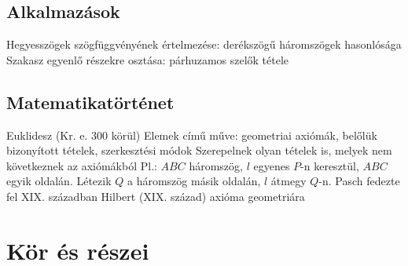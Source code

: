 \documentclass[twoside,12pt]{report}
\theoremstyle{definition}
\begin{document}
\section{Alkalmazások}
	\begin{outline}
		\1 Hegyesszögek szögfüggvényének értelmezése: derékszögű háromszögek hasonlósága
		\1 Szakasz egyenlő részekre osztása: párhuzamos szelők tétele
	\end{outline}
\section{Matematikatörténet}
	\begin{outline}
		\1 Euklidesz (Kr. e. 300 körül)
			\2 Elemek című műve: geometriai axiómák, belőlük bizonyított tételek, szerkesztési módok
			\2 Szerepelnek olyan tételek is, melyek nem következnek az axiómákból
			\2 Pl.:  $ABC$ háromszög, $l$ egyenes $P$-n keresztül, $ABC$ egyik oldalán. Létezik $Q$ a háromszög másik oldalán, $l$ átmegy $Q$-n.
				\3 Pasch fedezte fel XIX. században
		\1 Hilbert (XIX. század)
			 axióma geometriára 
	\end{outline}
\chapter{Kör és részei}
\end{document}
